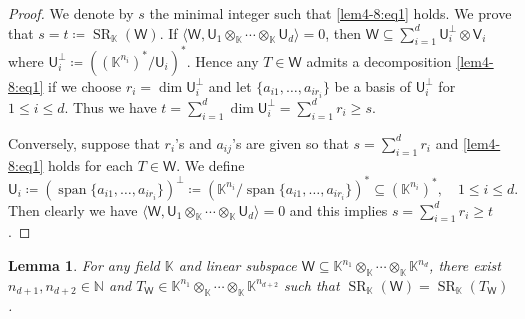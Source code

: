 \documentclass[10pt]{article}
\newtheorem{lemma}[theorem]{Lemma}
\theoremstyle{definition}
\DeclareMathOperator{\sr}{SR}
\DeclareMathOperator{\spa}{span}
\begin{document}
\begin{proof}
We denote by $s$ the minimal integer such that \eqref{lem4-8:eq1} holds.  We prove that $s = t \coloneqq \sr_{\mathbb{K}}(\mathsf{W})$.  If $\langle \mathsf{W}, \mathsf{U}_{1} \otimes_{\mathbb{K}}  \cdots \otimes_{\mathbb{K}}  \mathsf{U}_{d}\rangle=0$,  then $\mathsf{W} \subseteq \sum_{i=1}^d \mathsf{U}_{i}^{\perp} \otimes \mathsf{V}_{i}$ where $\mathsf{U}_{i}^{\perp} \coloneqq ( (\mathbb{K}^{n_i})^\ast/\mathsf{U}_i)^\ast$.  Hence any $T\in \mathsf{W}$ admits a decomposition \eqref{lem4-8:eq1} if we choose $r_i = \dim \mathsf{U}_i^{\perp}$ and let $\{a_{i1},\dots,  a_{ir_i}\}$ be a basis of $\mathsf{U}_i^{\perp}$ for $1 \le i \le d$.  Thus we have $t = \sum_{i=1}^d \dim \mathsf{U}_i^\perp = \sum_{i=1}^d r_i \ge s$.

Conversely,  suppose that $r_i$'s and $a_{ij}$'s are given so that $s = \sum_{i=1}^d r_i$ and \eqref{lem4-8:eq1} holds for each $T \in \mathsf{W}$.  We define 
\[
\mathsf{U}_i \coloneqq \left( \spa  \{ a_{i1},\dots,  a_{ir_i} \} \right)^\perp  \coloneqq \left(\mathbb{K}^{n_i}/\spa  \{ a_{i1},\dots,  a_{ir_i} \} \right)^\ast \subseteq (\mathbb{K}^{n_i})^\ast,\quad 1 \le i \le d.
\]
Then clearly we have $\langle \mathsf{W}, \mathsf{U}_{1} \otimes_{\mathbb{K}}  \cdots \otimes_{\mathbb{K}}   \mathsf{U}_{d}\rangle = 0$ and this implies $s = \sum_{i=1}^d r_i \ge t$.
\end{proof}
\begin{lemma}\label{lem4-9}
For any field $\mathbb{K}$ and linear subspace $\mathsf{W} \subseteq \mathbb{K}^{n_1} \otimes_{\mathbb{K}}  \cdots \otimes_{\mathbb{K}}  \mathbb{K}^{n_d}$,  there exist $n_{d+1},n_{d+2} \in \mathbb{N}$ and $T_{\mathsf{W}}\in \mathbb{K}^{n_1} \otimes_{\mathbb{K}}   \cdots \otimes_{\mathbb{K}}  \mathbb{K}^{n_{d+2}}$ such that $\sr_{\mathbb{K}}(\mathsf{W}) = \sr_{\mathbb{K}}(T_{\mathsf{W}})$. 
\end{lemma}
\end{document}
